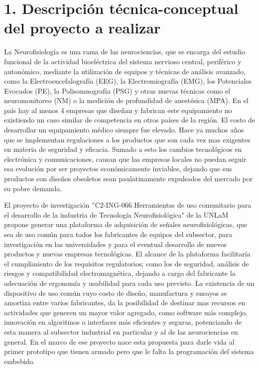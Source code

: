 \documentclass[
11pt, %
codirector, %
]{charter}
\begin{document}
\section{1. Descripción técnica-conceptual del proyecto a realizar}
\label{sec:descripcion}


La Neurofisiología es una rama de las neurociencias, que se encarga del estudio funcional de la actividad bioeléctrica del sistema nervioso central, periférico y autonómico, mediante la utilización de equipos y técnicas de análisis avanzado, como la Electroencefalografía (EEG), la Electromiografía (EMG), los Potenciales Evocados (PE), la Polisomnografía (PSG) y otras nuevas técnicas como el neuromonitoreo (NM) o la medición de profundidad de anestésica (MPA). En el país hay al menos 4 empresas que diseñan y fabrican este equipamiento no existiendo un caso similar de competencia en otros países de la región. El costo de desarrollar un equipamiento médico siempre fue elevado. Hace ya muchos años que se implementan regulaciones a los productos que son cada vez mas exigentes en materia de seguridad y eficacia. Sumado a esto los cambios tecnológicos en electrónica y comunicaciones, causan que las empresas locales no puedan seguir esa evolución por ser proyectos económicamente inviables, dejando que sus productos con diseños obsoletos sean paulatinamente expulsados del mercado por su pobre demanda. 

El proyecto de investigación ''C2-ING-066 Herramientas de uso comunitario para el desarrollo de la industria de Tecnología Neurofisiológica" de la UNLaM propone generar una plataforma de adquisición de señales neurofisiológicas, que sea de uso común para todos los fabricantes de equipos del subsector, para investigación en las universidades y para el eventual desarrollo de nuevos productos y nuevas empresas tecnológicas. El alcance de la plataforma facilitaría el cumplimiento de los requisitos regulatorios; como los de seguridad, análisis de riesgos y compatibilidad electromagnética, dejando a cargo del fabricante la adecuación de ergonomía y usabilidad para cada uso previsto. La existencia de un dispositivo de uso común cuyo costo de diseño, manufactura y ensayos se amortiza entre varios fabricantes, da la posibilidad de destinar mas recursos en actividades que generen un mayor valor agregado, como software más complejo, innovación en algoritmos o interfaces más eficientes y seguras, potenciando de esta manera al subsector industrial en particular y al de las neurociencias en general. En el marco de ese proyecto nace esta propuesta para darle vida al primer prototipo que tienen armado pero que le falta la programación del sistema embebido.
\end{document}
